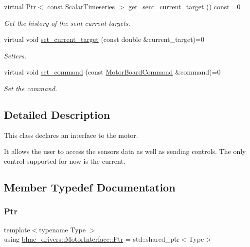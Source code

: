 \begin{DoxyCompactItemize}
virtual \hyperlink{classblmc__drivers_1_1MotorInterface_ae31f230b9da3674a05543023c90b124c}{Ptr}$<$ const \hyperlink{classblmc__drivers_1_1MotorInterface_a49b8fc916b9f9debbd7b0988463db5cd}{Scalar\+Timeseries} $>$ \hyperlink{classblmc__drivers_1_1MotorInterface_a709804e11aa22fbb3107e781c9799bdb}{get\+\_\+sent\+\_\+current\+\_\+target} () const =0
\begin{DoxyCompactList}\small\item\em Get the history of the sent current targets. \end{DoxyCompactList}\item 
virtual void \hyperlink{classblmc__drivers_1_1MotorInterface_a76b49a1228ad549fa407a54c8da14d13}{set\+\_\+current\+\_\+target} (const double \&current\+\_\+target)=0
\begin{DoxyCompactList}\small\item\em Setters. \end{DoxyCompactList}\item 
virtual void \hyperlink{classblmc__drivers_1_1MotorInterface_a723a772b2be5beb0f07097a5b3e00a89}{set\+\_\+command} (const \hyperlink{classblmc__drivers_1_1MotorBoardCommand}{Motor\+Board\+Command} \&command)=0
\begin{DoxyCompactList}\small\item\em Set the command. \end{DoxyCompactList}\end{DoxyCompactItemize}


\subsection{Detailed Description}
This class declares an interface to the motor. 

It allows the user to access the sensors data as well as sending controls. The only control supported for now is the current. 

\subsection{Member Typedef Documentation}
\mbox{\label{classblmc__drivers_1_1MotorInterface_ae31f230b9da3674a05543023c90b124c}} 
\subsubsection{\texorpdfstring{Ptr}{Ptr}}
{\footnotesize\ttfamily template$<$typename Type $>$ \\
using \hyperlink{classblmc__drivers_1_1MotorInterface_ae31f230b9da3674a05543023c90b124c}{blmc\+\_\+drivers\+::\+Motor\+Interface\+::\+Ptr} =  std\+::shared\+\_\+ptr$<$Type$>$}




